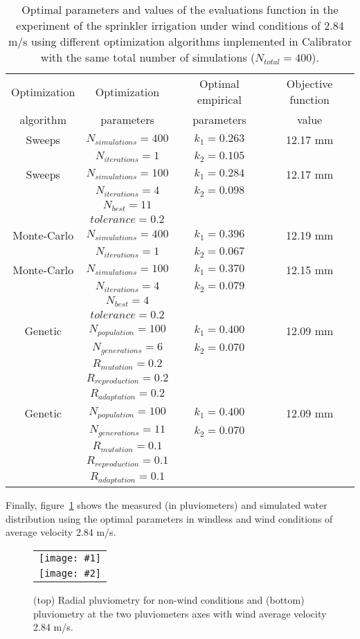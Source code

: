 \documentclass[review,authoryear]{elsarticle}
\newcommand{\TABLE}[5]
{
	\begin{table}[ht!]
		\centering
		\caption{#4.\label{#5}}
		#1
		\begin{tabular}{#2}
			#3
		\end{tabular}
	\end{table}
}
\newcommand{\FIGII}[4]
{
	\begin{figure}[ht!]
		\centering
		\begin{tabular}{c}
			\texttt{[image: \#1]} \\ \texttt{[image: \#2]}
		\end{tabular}
		\caption{#3.\label{#4}}
	\end{figure}
}
\begin{document}
\TABLE{\scriptsize}{cccc}
{
	Optimization & Optimization & Optimal empirical & Objective function
	\\ algorithm & parameters & parameters & value
	\\ \hline
	Sweeps & $N_{simulations}=400$ & $k_1=0.263$ & 12.17 mm
	\\ & $N_{iterations}=1$ & $k_2=0.105$
	\\ \hline
	Sweeps & $N_{simulations}=100$ & $k_1=0.284$ & 12.17 mm
	\\ & $N_{iterations}=4$ & $k_2=0.098$
	\\ & $N_{best}=11$
	\\ & $tolerance=0.2$
	\\ \hline
	Monte-Carlo & $N_{simulations}=400$ & $k_1=0.396$ & 12.19 mm
	\\ & $N_{iterations}=1$ & $k_2=0.067$
	\\ \hline
	Monte-Carlo & $N_{simulations}=100$ & $k_1=0.370$ & 12.15 mm
	\\ & $N_{iterations}=4$ & $k_2=0.079$
	\\ & $N_{best}=4$
	\\ & $tolerance=0.2$
	\\ \hline
	Genetic & $N_{population}=100$ & $k_1=0.400$ & 12.09 mm
	\\ & $N_{generations}=6$ & $k_2=0.070$
	\\ & $R_{mutation}=0.2$
	\\ & $R_{reproduction}=0.2$
	\\ & $R_{adaptation}=0.2$
	\\ \hline
	Genetic & $N_{population}=100$ & $k_1=0.400$ & 12.09 mm
	\\ & $N_{generations}=11$ & $k_2=0.070$
	\\ & $R_{mutation}=0.1$
	\\ & $R_{reproduction}=0.1$
	\\ & $R_{adaptation}=0.1$
	\\ \hline
}{Optimal parameters and values of the evaluations function in the experiment of the sprinkler irrigation under wind conditions of 2.84 m/s using different optimization algorithms implemented in Calibrator with the same total number of simulations ($N_{total}=400$)}{TabSprinklerII}

Finally, figure~\ref{FigSprinkler} shows the measured (in pluviometers) and simulated water distribution using the optimal parameters in windless and wind conditions of average velocity 2.84 m/s.

\FIGII{sprinkler-0.eps}{sprinkler-2,84.eps}
{(top) Radial pluviometry for non-wind conditions and (bottom) pluviometry at
the two pluviometers axes with wind average velocity 2.84 m/s}{FigSprinkler}
\end{document}
